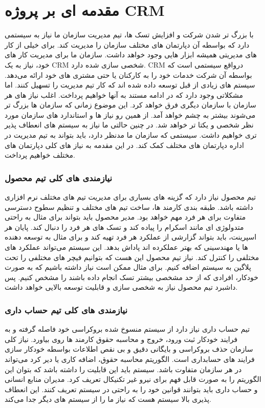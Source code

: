 \section{مقدمه ای بر پروژه CRM}
با بزرگ تر شدن شرکت و افزایش تسک ها، تیم مدیریت سازمان ما نیاز به سیستمی دارد که بواسطه آن دپارتمان های مختلف سازمان را مدیریت کند.
برای خیلی از کار های مدیریتی همیشه ابزار هایی وجود خواهد داشت. سازمان ما برای مدیریت کار های خود، نیاز به یک CRM شخصی سازی شده دارد.
CRM درواقع سیستمی است که بواسطه آن شرکت خدمات خود را به کارکنان یا حتی مشتری های خود ارائه می‌دهد.
سیستم های زیادی از قبل توسعه داده شده اند که کار تیم مدیریت را تسهیل کنند. اما مشکلاتی وجود دارد که در ادامه مستند به آنها خواهیم پرداخت.
اغلب نیاز های هر سازمان با سازمان دیگری فرق خواهد کرد. این موضوع زمانی که سازمان ها بزرگ تر می‌شوند بیشتر به چشم خواهد آمد.
از همین رو نیاز ها و استاندارد های سازمان مورد نظر شخصی و یکتا تر خواهد شد. در چنین حالتی ما نیاز به سیستم های انعطاف پذیر تری خواهیم داشت.
سیستمی که سازمان ما مدنظر دارد، باید بتواند به تیم مدیریت در اداره دپارتمان های مختلف کمک کند. در این مقدمه به نیاز های کلی دپارتمان های مختلف خواهیم پرداخت.

\subsubsection{نیازمندی های کلی تیم محصول}
تیم محصول نیاز دارد که گزینه های بسیاری برای مدیریت تیم های مختلف نرم افزاری داشته باشد. طبقه بندی کارمند ها، ساخت تیم های مختلف و تنظیم سطوح دسترسی متفاوت برای هر فرد مهم خواهد بود.
مدیر محصول باید بتواند برای مثال به راحتی متدولوژی ای مانند اسکرام را پیاده کند و تسک های هر فرد را دنبال کند.
پایان هر اسپرینت، باید بتواند گزارشی از عملکرد هر فرد تهیه کند و برای مثال به توسعه دهنده ها یا مهندسینی که بهتر عملکرده اند پاداش بدهد.
این سیستم می‌تواند عملکرد های مختلفی را کنترل کند. نیاز تیم محصول این هست که بتوانیم فیچر های مختلفی را تحت پلاگین به سیستم اضافه کنیم.
برای مثال ممکن است نیاز داشته باشیم که به صورت خودکار، افرادی که از حد مشخصی بیشتر تسک انجام داده باشند را مشخص کنیم.
پس داشبرد تیم محصول نیاز به شخصی سازی و قابلیت توسعه بالایی خواهد داشت.

\subsubsection{نیازمندی های کلی تیم حساب داری}
تیم حساب داری نیاز دارد از سیستم منسوخ شده بروکراسی خود فاصله گرفته و به فرایند خودکار ثبت ورود، خروج و محاسبه حقوق کارمند ها روی بیاورد.
نیاز کلی سازمان حذف بروکراسی و بایگانی دقیق و بی نقص اطلاعات بواسطه خودکار سازی فرایند های حسابداری است.
الگوریتم محاسبه حقوق، اضافه کاری یا دیر کرد می‌تواند در هر سازمان متفاوت باشد.
سیستم باید این قابلیت را داشته باشد که بتوان این الگوریتم را به صورت قابل فهم برای نیرو غیر تکنیکال تعریف کرد. مدیران منابع انسانی و حساب داری باید بتوانند قوانین خود را
به راحتی در سیستم تعریف کنند.
این انعطاف پذیری بالا سیستم هست که نیاز ما را از سیستم های دیگر جدا می‌کند.

